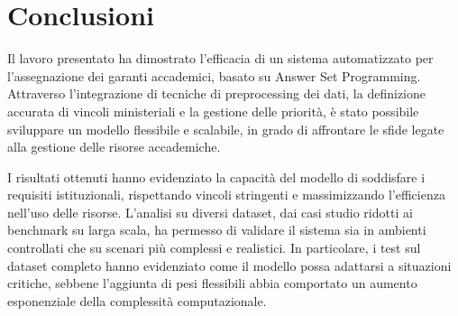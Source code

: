 \section{Conclusioni}
\label{sec:conclusion}

Il lavoro presentato ha dimostrato l'efficacia di un sistema automatizzato per 
l'assegnazione dei garanti accademici, basato su Answer Set Programming. 
Attraverso l'integrazione di tecniche di preprocessing dei dati, la definizione 
accurata di vincoli ministeriali e la gestione delle priorità, è stato possibile 
sviluppare un modello flessibile e scalabile, in grado di affrontare le sfide 
legate alla gestione delle risorse accademiche.

I risultati ottenuti hanno evidenziato la capacità del modello di soddisfare i 
requisiti istituzionali, rispettando vincoli stringenti e massimizzando l'efficienza 
nell'uso delle risorse. L'analisi su diversi dataset, dai casi studio ridotti ai 
benchmark su larga scala, ha permesso di validare il sistema sia in ambienti 
controllati che su scenari più complessi e realistici. In particolare, i test 
sul dataset completo hanno evidenziato come il modello possa adattarsi a situazioni 
critiche, sebbene l'aggiunta di pesi flessibili abbia comportato un aumento 
esponenziale della complessità computazionale.